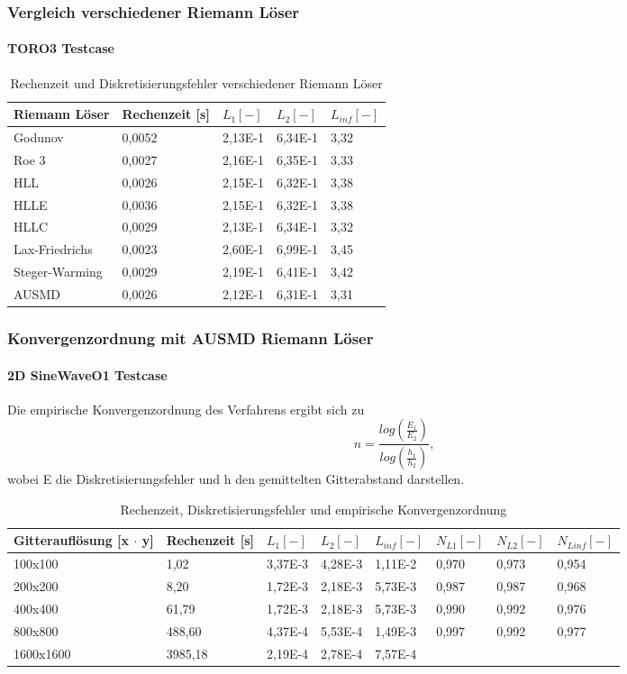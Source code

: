\documentclass[
	11pt, %
	aspectratio=169, %
]{beamer}
\begin{document}
\begin{frame}
	\frametitle{Vergleich verschiedener Riemann Löser}
	\framesubtitle{TORO3 Testcase} %
	
		\begin{table}
			\begin{tabular}{l l l l l}
				\toprule
				Riemann Löser & Rechenzeit [s] & $L_1 [-]$& $L_2 [-]$& $L_{inf} [-]$\\
				\midrule
				Godunov & 0,0052 & 2,13E-1 & 6,34E-1 & 3,32 \\
				Roe 3 & 0,0027 & 2,16E-1 & 6,35E-1 & 3,33 \\
				HLL & 0,0026 & 2,15E-1 & 6,32E-1 & 3,38 \\
				HLLE & 0,0036 & 2,15E-1 & 6,32E-1 & 3,38 \\
				HLLC & 0,0029 & 2,13E-1 & 6,34E-1 & 3,32 \\
				Lax-Friedrichs & 0,0023 & 2,60E-1 & 6,99E-1 & 3,45 \\
				Steger-Warming & 0,0029 & 2,19E-1 & 6,41E-1 & 3,42 \\
				AUSMD & 0,0026 & 2,12E-1 & 6,31E-1 & 3,31
			\end{tabular}
			\caption{Rechenzeit und Diskretisierungsfehler verschiedener Riemann Löser}
		\end{table}
\end{frame}
	
	\begin{frame}
		\frametitle{Konvergenzordnung mit AUSMD Riemann Löser}
		\framesubtitle{2D SineWaveO1 Testcase} %
		
		Die empirische Konvergenzordnung des Verfahrens ergibt sich zu
		$$n=\frac{log(\frac{E_1}{E_2})}{log(\frac{h_1}{h_2})},$$
		wobei E die Diskretisierungsfehler und h den gemittelten Gitterabstand darstellen.
		
		\begin{table}
			\begin{tabular}{l l l l l l l l}
				\toprule
				Gitterauflösung [x $\cdot$ y] & Rechenzeit [s] & $L_1 [-]$& $L_2 [-]$& $L_{inf} [-]$ & $N_{L1} [-]$ & $N_{L2} [-]$ & $N_{Linf} [-]$\\
				\midrule
				100x100 & 1,02 & 3,37E-3 & 4,28E-3 & 1,11E-2 & 0,970 & 0,973 & 0,954\\
				200x200 & 8,20 & 1,72E-3 & 2,18E-3 & 5,73E-3 &0,987 & 0,987 & 0,968 \\
				400x400 & 61,79 & 1,72E-3 & 2,18E-3 & 5,73E-3 & 0,990 & 0,992 & 0,976 \\
				800x800 & 488,60 & 4,37E-4 & 5,53E-4 & 1,49E-3 & 0,997 & 0,992 & 0,977 \\
				1600x1600 & 3985,18 & 2,19E-4 & 2,78E-4 & 7,57E-4 \\
			\end{tabular}
			\caption{Rechenzeit, Diskretisierungsfehler und empirische Konvergenzordnung}
		\end{table}
	\end{frame}
	
\end{document}
